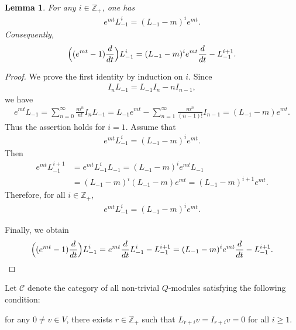 \documentclass[a4paper]{amsart}
\numberwithin{equation}{section}
\newtheorem{lemma}[theorem]{Lemma}
\begin{document}
\begin{lemma}\label{lem:admissible-shift}
For any $i\in \mathbb Z_+$, one has
\begin{align*}
e^{mt}L_{-1}^i=(L_{-1}-m)^i e^{mt}.
\end{align*}
Consequently,
\begin{align*}
\Bigl((e^{mt}-1)\frac{d}{dt}\Bigr)L_{-1}^i
=
(L_{-1}-m)^i e^{mt}\frac{d}{dt}-L_{-1}^{i+1}.
\end{align*}
\end{lemma}
\begin{proof}
We prove the first identity by induction on $i$. Since
\begin{align*}
I_nL_{-1}=L_{-1}I_n-nI_{n-1},
\end{align*}
we have
\begin{align*}
e^{mt}L_{-1}
=
\sum_{n=0}^\infty \frac{m^n}{n!}I_nL_{-1}
=
L_{-1}e^{mt}-\sum_{n=1}^\infty \frac{m^n}{(n-1)!}I_{n-1}
=
(L_{-1}-m)e^{mt}.
\end{align*}
Thus the assertion holds for $i=1$. Assume that
\begin{align*}
e^{mt}L_{-1}^i=(L_{-1}-m)^i e^{mt}.
\end{align*} 
Then
\begin{align*}
e^{mt}L_{-1}^{i+1}
&=e^{mt}L_{-1}^iL_{-1}
=(L_{-1}-m)^i e^{mt}L_{-1}\\
&=(L_{-1}-m)^i(L_{-1}-m)e^{mt}
=(L_{-1}-m)^{i+1}e^{mt}.
\end{align*}
Therefore, for all $i\in \mathbb Z_+$,
\begin{align*}
e^{mt}L_{-1}^i=(L_{-1}-m)^i e^{mt}.
\end{align*}

Finally, 
we obtain
\begin{align*}
\Bigl((e^{mt}-1)\frac{d}{dt}\Bigr)L_{-1}^i
=
e^{mt}\frac{d}{dt}L_{-1}^i-L_{-1}^{i+1}
=
(L_{-1}-m)^i e^{mt}\frac{d}{dt}-L_{-1}^{i+1}.
\end{align*}
\end{proof}

Let $\mathcal{C}$ denote the category of all non-trivial $Q$-modules satisfying the following condition:

for any $0\neq v\in V$, there exists $r\in
\mathbb{Z}_{+}$ such that $L_{r+i}v=I_{r+i}v=0$ for all $i\ge 1.$ 
\end{document}
